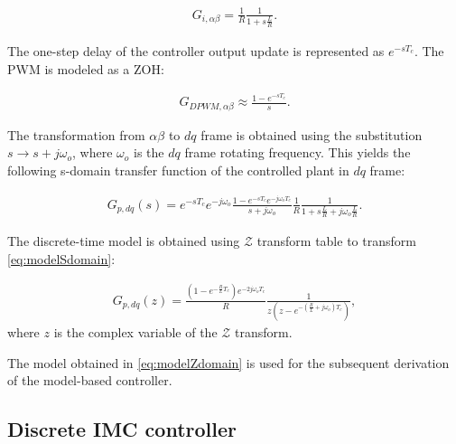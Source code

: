 \documentclass[journal]{IEEEtran}
\begin{document}
\begin{equation}
\begin{aligned}
G_{i,\alpha \beta} = \frac{1}{R} \frac{1}{1 + s \frac{L}{R}}.
\label{eq:sDomainAlphaBeta} 
\end{aligned}    
\end{equation}


The one-step delay of the controller output update is represented as $e^{-s T_c}$. The PWM is modeled as a ZOH:

\begin{equation}
\begin{aligned}
G_{DPWM,\alpha \beta} \approx \frac{1-e^{-sT_c}}{s}.
\label{eq:DPWMAlphaBeta} 
\end{aligned}    
\end{equation}

The transformation from $\alpha \beta$ to $dq$ frame is obtained using the substitution $s \rightarrow s + j \omega_o$, where $\omega_o$ is the $dq$ frame rotating frequency.
This yields the following s-domain transfer function of the controlled plant in $dq$ frame:

\begin{equation}
\begin{aligned}
G_{p,dq}(s) = e^{-s T_c} e^{-j\omega_o} \frac{1-e^{-sT_c}e^{-j\omega_oT_c}}{s+j\omega_o} \frac{1}{R} \frac{1}{1 + s \frac{L}{R} + j\omega_o \frac{L}{R}}.
\label{eq:modelSdomain} 
\end{aligned}    
\end{equation}
 
The discrete-time model is obtained using $\mathcal{Z}$ transform table to transform \ref{eq:modelSdomain}:

\begin{equation}
\begin{aligned}
G_{p,dq}(z) = \frac{\left( 1 - e^{-\frac{R}{L}T_c}\right) e^{-2j\omega_o T_c}}{R} \frac{1}{z \left( z - e^{- \left( \frac{R}{L} + j\omega_o\right) T_c}\right)},
\label{eq:modelZdomain} 
\end{aligned}    
\end{equation}
where $z$ is the complex variable of the $\mathcal{Z}$ transform.

The model obtained in \ref{eq:modelZdomain} is used for the subsequent derivation of the model-based controller.
 
\subsection{Discrete IMC controller}
\end{document}
